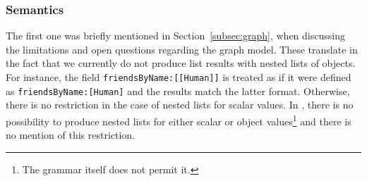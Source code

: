


\iffalse 
\subsubsection*{Semantics}


The first one was briefly mentioned in Section~\ref{subsec:graph}, when discussing the limitations and open questions regarding the graph model. These translate in the fact that we currently do not produce list results with nested lists of objects. For instance, the field \texttt{friendsByName:[[Human]]} is treated as if it were defined as \texttt{friendsByName:[Human]} and the results match the latter format. Otherwise, there is no restriction in the case of nested lists for scalar values. In \HP, there is no possibility to produce nested lists for either scalar or object values\footnote{The grammar itself does not permit it.} and there is no mention of this restriction.

